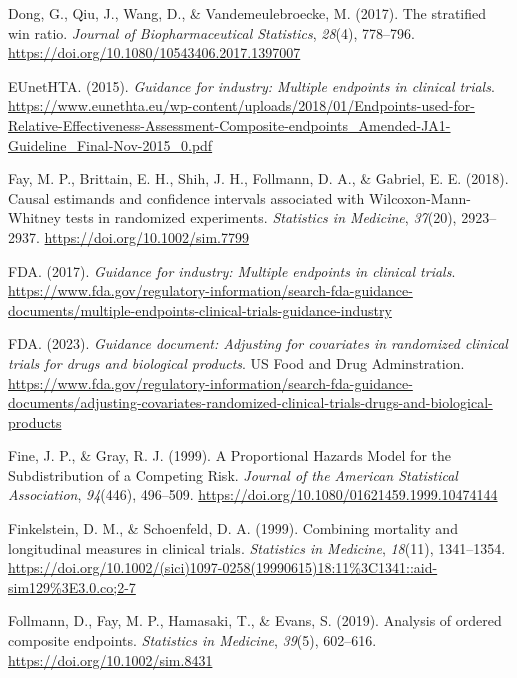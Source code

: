 \documentclass[
  letterpaper,
  DIV=11,
  numbers=noendperiod]{scrreprt}
\newlength{\cslhangindent}
\newlength{\cslentryspacingunit} %
\newenvironment{CSLReferences}[2] %
 {%
  \setlength{\parindent}{0pt}
  \ifodd #1
  \let\oldpar\par
  \def\par{\hangindent=\cslhangindent\oldpar}
  \fi
  \setlength{\parskip}{#2\cslentryspacingunit}
 }%
 {}
\begin{document}
\begin{CSLReferences}{1}{0}
\leavevmode{}%
Dong, G., Qiu, J., Wang, D., \& Vandemeulebroecke, M. (2017). The
stratified win ratio. \emph{Journal of Biopharmaceutical Statistics},
\emph{28}(4), 778--796.
\url{https://doi.org/10.1080/10543406.2017.1397007}

\leavevmode{}%
EUnetHTA. (2015). \emph{Guidance for industry: Multiple endpoints in
clinical trials}.
\url{https://www.eunethta.eu/wp-content/uploads/2018/01/Endpoints-used-for-Relative-Effectiveness-Assessment-Composite-endpoints_Amended-JA1-Guideline_Final-Nov-2015_0.pdf}

\leavevmode{}%
Fay, M. P., Brittain, E. H., Shih, J. H., Follmann, D. A., \& Gabriel,
E. E. (2018). Causal estimands and confidence intervals associated with
Wilcoxon{-}Mann{-}Whitney tests in randomized experiments.
\emph{Statistics in Medicine}, \emph{37}(20), 2923--2937.
\url{https://doi.org/10.1002/sim.7799}

\leavevmode{}%
FDA. (2017). \emph{Guidance for industry: Multiple endpoints in clinical
trials}.
\url{https://www.fda.gov/regulatory-information/search-fda-guidance-documents/multiple-endpoints-clinical-trials-guidance-industry}

\leavevmode{}%
FDA. (2023). \emph{Guidance document: Adjusting for covariates in
randomized clinical trials for drugs and biological products}. US Food
and Drug Adminstration.
\url{https://www.fda.gov/regulatory-information/search-fda-guidance-documents/adjusting-covariates-randomized-clinical-trials-drugs-and-biological-products}

\leavevmode{}%
Fine, J. P., \& Gray, R. J. (1999). A Proportional Hazards Model for the
Subdistribution of a Competing Risk. \emph{Journal of the American
Statistical Association}, \emph{94}(446), 496--509.
\url{https://doi.org/10.1080/01621459.1999.10474144}

\leavevmode{}%
Finkelstein, D. M., \& Schoenfeld, D. A. (1999). Combining mortality and
longitudinal measures in clinical trials. \emph{Statistics in Medicine},
\emph{18}(11), 1341--1354.
\url{https://doi.org/10.1002/(sici)1097-0258(19990615)18:11\%3C1341::aid-sim129\%3E3.0.co;2-7}

\leavevmode{}%
Follmann, D., Fay, M. P., Hamasaki, T., \& Evans, S. (2019). Analysis of
ordered composite endpoints. \emph{Statistics in Medicine},
\emph{39}(5), 602--616. \url{https://doi.org/10.1002/sim.8431}


\end{CSLReferences}
\end{document}
